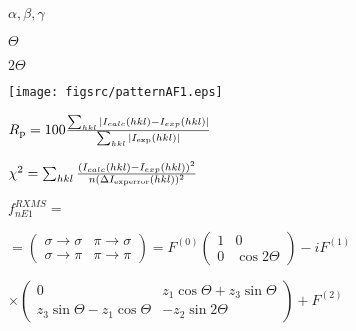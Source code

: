 \documentclass[twoside]{article}
\def\lthtmlcheckvsize{\ifdim\ht\sizebox<\vsize 
  \ifdim\wd\sizebox<\hsize\expandafter\hfill\fi \expandafter\vfill
  \else\expandafter\vss\fi}%
\begin{document}
{\newpage\clearpage
{}%
$\alpha,\beta,\gamma$%
\lthtmlindisplaymathZ
\lthtmlcheckvsize\clearpage}

{\newpage\clearpage
{}%
$\Theta$%
\lthtmlindisplaymathZ
\lthtmlcheckvsize\clearpage}

{\newpage\clearpage
{}%
$2\Theta$%
\lthtmlindisplaymathZ
\lthtmlcheckvsize\clearpage}

{\newpage\clearpage
{}%
\texttt{[image: figsrc/patternAF1.eps]}%
\lthtmlpictureZ
\lthtmlcheckvsize\clearpage}

{\newpage\clearpage
{}%
$R_{\rm p}=100
\frac{\sum_{hkl} |I_{calc}(hkl)-I_{exp}(hkl)|}{\sum_{hkl}|I_{\rm 
exp}(hkl)|}$%
\lthtmlindisplaymathZ
\lthtmlcheckvsize\clearpage}

{\newpage\clearpage
{}%
$\chi^2=\sum_{hkl}\frac{ (I_{calc}(hkl)-I_{exp}(hkl))^2}{n(\Delta I_{\rm 
experror}(hkl))^2}$%
\lthtmlindisplaymathZ
\lthtmlcheckvsize\clearpage}

{\newpage\clearpage
{}%
$\displaystyle f_{nE1}^{RXMS}=$%
\lthtmlindisplaymathZ
\lthtmlcheckvsize\clearpage}

{\newpage\clearpage
{}%
$\displaystyle =\left (
\begin{array}{cc}
\sigma \rightarrow \sigma & \pi \rightarrow \sigma \\
\sigma \rightarrow \pi & \pi \rightarrow \pi
\end{array}
\right) = F^{(0)}
\left ( \begin{array}{cc}
1 & 0 \\
0 & \cos2\Theta
\end{array} \right )
-iF^{(1)}$%
\lthtmlindisplaymathZ
\lthtmlcheckvsize\clearpage}

{\newpage\clearpage
{}%
$\displaystyle \times
\left ( \begin{array}{cc}
0 & z_1 \cos \Theta + z_3 \sin \Theta \\
z_3 \sin \Theta - z_1 \cos \Theta & -z_2 \sin 2\Theta
\end{array} \right ) + F^{(2)}$%
\lthtmlindisplaymathZ
\lthtmlcheckvsize\clearpage}
\end{document}

